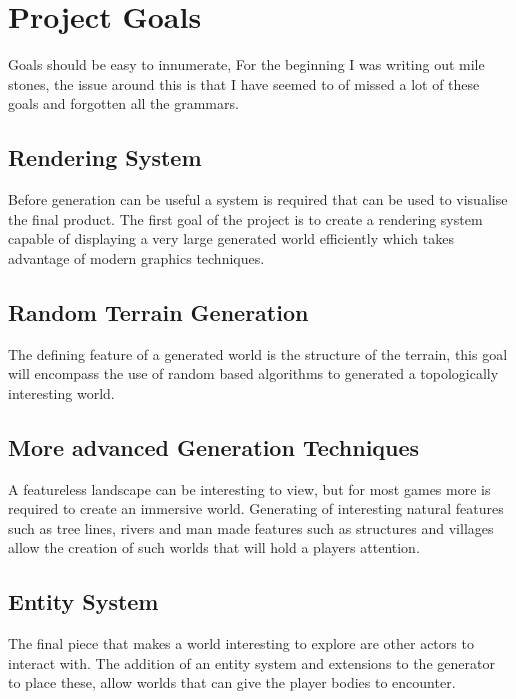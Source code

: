 \section{Project Goals}

Goals should be easy to innumerate, For the beginning I was writing out mile
stones, the issue around this is that I have seemed to of missed a lot of these
goals and forgotten all the grammars.\\

\subsection{Rendering System}
Before generation can be useful a system is required that can be used to 
visualise the final product. The first goal of the project is to create a
rendering system capable of displaying a very large generated world efficiently 
which takes advantage of modern graphics techniques.\\

\subsection{Random Terrain Generation}
The defining feature of a generated world is the structure of the terrain, this
goal will encompass the use of random based algorithms to generated a 
topologically interesting world.\\

\subsection{More advanced Generation Techniques}
A featureless landscape can be interesting to view, but for most games more is 
required to create an immersive world. Generating of interesting natural features
such as tree lines, rivers and man made features such as structures and villages
allow the creation of such worlds that will hold a players attention.

\subsection{Entity System}
The final piece that makes a world interesting to explore are other actors to 
interact with. The addition of an entity system and extensions to the generator
to place these, allow worlds that can give the player bodies to encounter.\\
